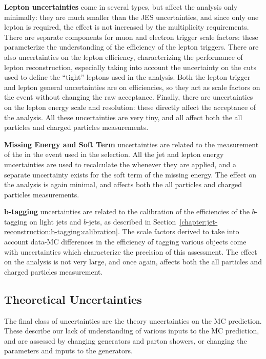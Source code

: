 	\textbf{Lepton uncertainties} come in several types, but affect the analysis only minimally: they are much smaller than the JES uncertainties, and since only one lepton is required, the effect is not increased by the multiplicity requirements. There are separate components for muon and electron trigger scale factors: these parameterize the understanding of the efficiency of the lepton triggers. There are also uncertainties on the lepton efficiency, characterizing the performance of lepton reconstruction, especially taking into account the uncertainty on the cuts used to define the ``tight'' leptons used in the analysis. Both the lepton trigger and lepton general uncertainties are on efficiencies, so they act as scale factors on the event without changing the raw acceptance. Finally, there are uncertainties on the lepton energy scale and resolution: these directly affect the acceptance of the analysis. All these uncertainties are very tiny, and all affect both the all particles and charged particles measurements.

	\textbf{Missing Energy and Soft Term} uncertainties are related to the measurement of the \met in the event used in the selection. All the jet and lepton energy uncertainties are used to recalculate the \met whenever they are applied, and a separate uncertainty exists for the soft term of the missing energy. The effect on the analysis is again minimal, and affects both the all particles and charged particles measurements.

	\textbf{$\mathbf{b}$-tagging} uncertainties are related to the calibration of the efficiencies of the $b$-tagging on light jets and $b$-jets, as described in Section~\ref{chapter:jet-reconstruction:b-tagging:calibration}. The scale factors derived to take into account data-MC differences in the efficiency of tagging various objects come with uncertainties which characterize the precision of this assessment. The effect on the analysis is not very large, and once again, affects both the all particles and charged particles measurement.


	\subsection{Theoretical Uncertainties}
	\label{chapter:color:uncertainties:theory}

	The final class of uncertainties are the theory uncertainties on the MC prediction. These describe our lack of understanding of various inputs to the MC prediction, and are assessed by changing generators and parton showers, or changing the parameters and inputs to the generators.

